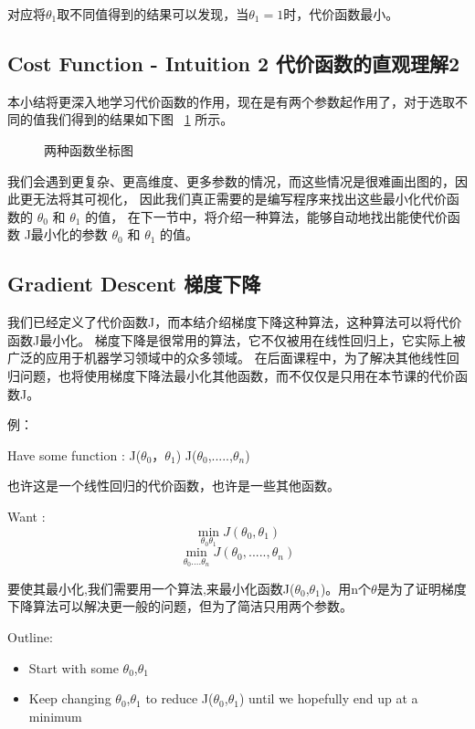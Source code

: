 \documentclass[UTF8]{ctexart}
\begin{document}
对应将$\theta_1$取不同值得到的结果可以发现，当$\theta_1=1$时，代价函数最小。

\subsection{Cost Function - Intuition 2 代价函数的直观理解2}
本小结将更深入地学习代价函数的作用，现在是有两个参数起作用了，对于选取不同的值我们得到的结果如下图 ~\ref{fig:4} 所示。
\begin{figure}[htb]
 \caption{两种函数坐标图}
 \label{fig:4}
\end{figure}

我们会遇到更复杂、更高维度、更多参数的情况，而这些情况是很难画出图的，因此更无法将其可视化，
因此我们真正需要的是编写程序来找出这些最小化代价函数的 $\theta_0$ 和 $\theta_1$ 的值，
在下一节中，将介绍一种算法，能够自动地找出能使代价函数 J最小化的参数 $\theta_0$ 和 $\theta_1$ 的值。
\subsection{Gradient Descent 梯度下降}
我们已经定义了代价函数J，而本结介绍梯度下降这种算法，这种算法可以将代价函数J最小化。
梯度下降是很常用的算法，它不仅被用在线性回归上，它实际上被广泛的应用于机器学习领域中的众多领域。
在后面课程中，为了解决其他线性回归问题，也将使用梯度下降法最小化其他函数，而不仅仅是只用在本节课的代价函数J。

例：


Have some function : J($\theta_0$，$\theta_1$) \quad J($\theta_0$,.....,$\theta_n$)

也许这是一个线性回归的代价函数，也许是一些其他函数。

Want : \begin{equation*}
  \min_{\theta_0 \theta_1}
  J(\theta_0,\theta_1)
\end{equation*}
\begin{equation*}
  \min_{\theta_0 .... \theta_n}
  J(\theta_0,.....,\theta_n)
\end{equation*}

要使其最小化,我们需要用一个算法,来最小化函数J($\theta_0$,$\theta_1$)。用n个$\theta$是为了证明梯度下降算法可以解决更一般的问题，但为了简洁只用两个参数。

Outline:
\begin{itemize}
 \item Start with some $\theta_0$,$\theta_1$
 \item Keep changing $\theta_0$,$\theta_1$ to reduce J($\theta_0$,$\theta_1$)
       until we hopefully end up at a minimum
\end{itemize}
\end{document}
